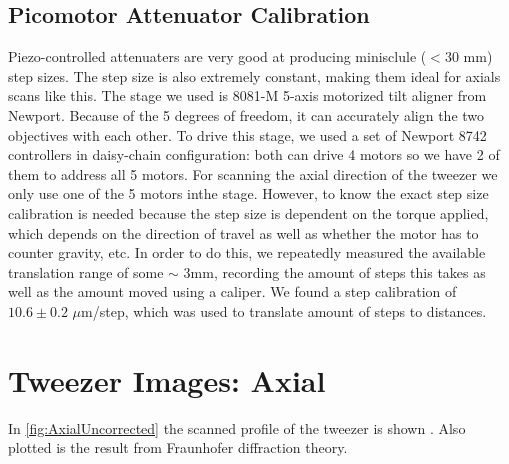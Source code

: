 \subsection{Picomotor Attenuator Calibration}

Piezo-controlled attenuaters are very good at producing minisclule ($<30$ mm) step sizes. The step size is also extremely constant, making them ideal for axials scans like this.
The stage we used is 8081-M 5-axis motorized tilt aligner from Newport. 
Because of the 5 degrees of freedom, it can accurately align the two objectives with each other. 
To drive this stage, we used a set of Newport 8742 controllers in daisy-chain configuration: both can drive 4 motors so we have 2 of them to address all 5 motors.
For scanning the axial direction of the tweezer we only use one of the 5 motors inthe stage. 
However, to know the exact step size calibration is needed because the step size is dependent on the torque applied, which depends on the direction of travel as well as whether the motor has to counter gravity, etc.
In order to do this, we repeatedly measured the available translation range of some $\sim$ 3mm, recording the amount of steps this takes as well as the amount moved using a caliper. 
We found a step calibration of $10.6 \pm 0.2$ $\mu$m/step, which was used to translate amount of steps to distances. 

\section{Tweezer Images: Axial}

In \cref{fig:AxialUncorrected} the scanned profile of the tweezer is shown . 
Also plotted is the result from Fraunhofer diffraction theory.











